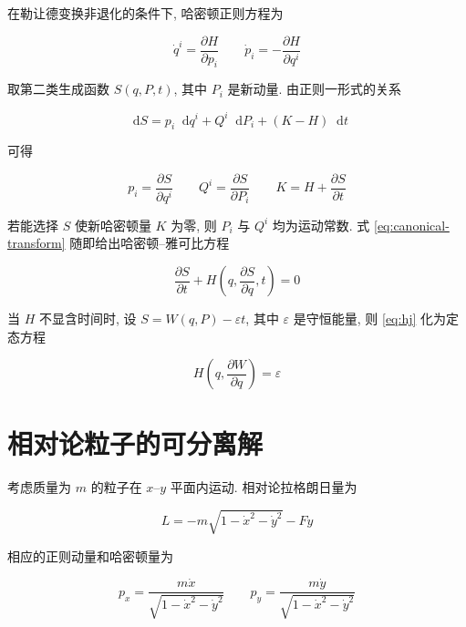 \documentclass[UTF8, a4paper, 11pt]{ctexart}
\newcommand{\F}{F}
\newcommand{\dd}{\mathop{}\!\mathrm{d}}
\begin{document}
在勒让德变换非退化的条件下, 哈密顿正则方程为

\begin{equation}
  \dot q^i=\frac{\partial H}{\partial p_i}
  \qquad
  \dot p_i=-\frac{\partial H}{\partial q^i}
  \label{eq:hamilton}
\end{equation}

取第二类生成函数 $S(q,P,t)$, 其中 $P_i$ 是新动量. 由正则一形式的关系

\begin{equation}
  \dd S=p_i\dd q^i+Q^i\dd P_i+(K-H)\dd t
\end{equation}

可得

\begin{equation}
  p_i=\frac{\partial S}{\partial q^i}
  \qquad
  Q^i=\frac{\partial S}{\partial P_i}
  \qquad
  K=H+\frac{\partial S}{\partial t}
  \label{eq:canonical-transform}
\end{equation}

若能选择 $S$ 使新哈密顿量 $K$ 为零, 则 $P_i$ 与 $Q^i$ 均为运动常数. 式 \eqref{eq:canonical-transform} 随即给出哈密顿--雅可比方程

\begin{equation}
  \frac{\partial S}{\partial t}
  +H\left(q,\frac{\partial S}{\partial q},t\right)=0
  \label{eq:hj}
\end{equation}

当 $H$ 不显含时间时, 设 $S=W(q,P)-\varepsilon t$, 其中 $\varepsilon$ 是守恒能量, 则 \eqref{eq:hj} 化为定态方程

\begin{equation}
  H\left(q,\frac{\partial W}{\partial q}\right)=\varepsilon
  \label{eq:time-independent-hj}
\end{equation}

\section{相对论粒子的可分离解}

考虑质量为 $m$ 的粒子在 $x$--$y$ 平面内运动. 相对论拉格朗日量为

\begin{equation}
  L=-m\sqrt{1-\dot x^2-\dot y^2}-\F y
  \label{eq:lagrangian}
\end{equation}

相应的正则动量和哈密顿量为

\begin{equation}
  p_x=\frac{m\dot x}{\sqrt{1-\dot x^2-\dot y^2}}
  \qquad
  p_y=\frac{m\dot y}{\sqrt{1-\dot x^2-\dot y^2}}
\end{equation}
\end{document}
